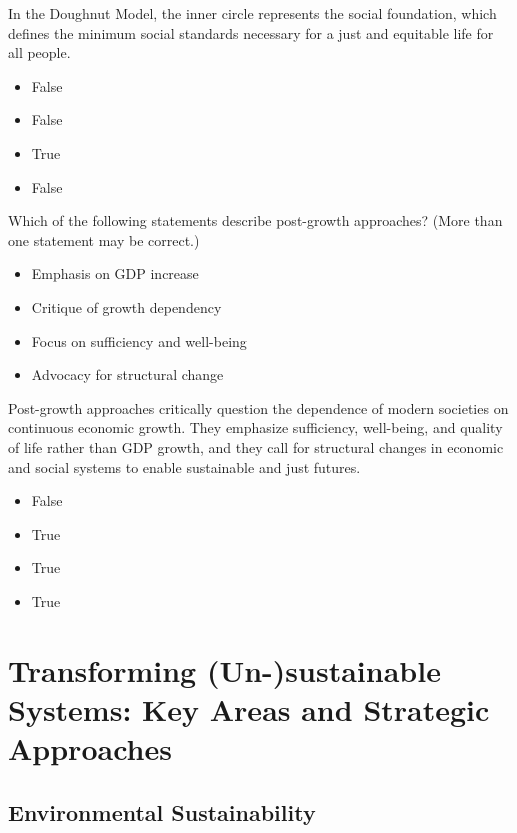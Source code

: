 \documentclass[
  a4paper,
  DIV=11,
  numbers=noendperiod,
  oneside,
  openany]{scrreprt}
\providecommand{\tightlist}{%
  \setlength{\itemsep}{0pt}\setlength{\parskip}{0pt}}
\begin{document}
In the Doughnut Model, the inner circle represents the social
foundation, which defines the minimum social standards necessary for a
just and equitable life for all people.

\begin{itemize}
\tightlist
\item
  False
\item
  False
\item
  True
\item
  False
\end{itemize}

Which of the following statements describe post-growth approaches? (More
than one statement may be correct.)

\begin{itemize}
\tightlist
\item[$\square$]
  Emphasis on GDP increase
\item[$\square$]
  Critique of growth dependency
\item[$\square$]
  Focus on sufficiency and well-being
\item[$\square$]
  Advocacy for structural change
\end{itemize}

Post-growth approaches critically question the dependence of modern
societies on continuous economic growth. They emphasize sufficiency,
well-being, and quality of life rather than GDP growth, and they call
for structural changes in economic and social systems to enable
sustainable and just futures.

\begin{itemize}
\tightlist
\item
  False
\item
  True
\item
  True
\item
  True
\end{itemize}

\part{Transforming (Un-)sustainable Systems: Key Areas and Strategic
Approaches}

\chapter{Environmental
Sustainability}\label{environmental-sustainability}
\end{document}
